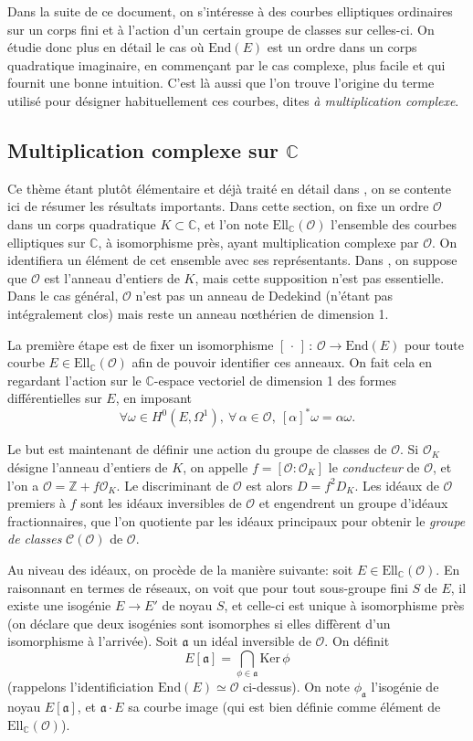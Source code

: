 \documentclass[11pt,a4paper]{article}
\newcommand{\Z}{\mathbb{Z}}
\newcommand{\C}{\mathbb{C}}
\renewcommand{\O}{\mathcal{O}}
\newcommand{\Cl}{\mathcal{C}}
\newcommand{\vers}{\longrightarrow}
\newcommand{\End}{\mathrm{End}}
\newcommand{\Ell}{\mathrm{Ell}}
\renewcommand{\frak}{\mathfrak}
\newcommand{\de}{\,:\,}
\theoremstyle{definition}
\begin{document}
Dans la suite de ce document, on s'intéresse à des courbes elliptiques ordinaires sur un corps fini et à l'action d'un certain groupe de classes sur celles-ci. On étudie donc plus en détail le cas où $\End(E)$ est un ordre dans un corps quadratique imaginaire, en commençant par le cas complexe, plus facile et qui fournit une bonne intuition. C'est là aussi que l'on trouve l'origine du terme utilisé pour désigner habituellement ces courbes, dites \emph{à multiplication complexe}.


\subsection{Multiplication complexe sur $\C$}


Ce thème étant plutôt élémentaire et déjà traité en détail dans \cite{Sil2}, on se contente ici de résumer les résultats importants. Dans cette section, on fixe un ordre $\O$ dans un corps quadratique $K\subset \C$, et l'on note $\Ell_\C(\O)$ l'ensemble des courbes elliptiques sur $\C$, à isomorphisme près, ayant multiplication complexe par $\O$. On identifiera un élément de cet ensemble avec ses représentants. Dans \cite{Sil2}, on suppose que $\O$ est l'anneau d'entiers de $K$, mais cette supposition n'est pas essentielle. Dans le cas général, $\O$ n'est pas un anneau de Dedekind (n'étant pas intégralement clos) mais reste un anneau n\oe thérien de dimension 1.

La première étape est de fixer un isomorphisme $[\,\cdot\,]\de \O\vers \End(E)$ pour toute courbe $E\in \Ell_\C(\O)$ afin de pouvoir identifier ces anneaux. On fait cela en regardant l'action sur le $\C$-espace vectoriel de dimension 1 des formes différentielles sur $E$, en imposant
$$\forall \omega\in H^0(E,\Omega^1),\ \forall\,\alpha\in\O,\ [\alpha]^*\omega = \alpha \omega.$$

Le but est maintenant de définir une action du groupe de classes de $\O$. Si $\O_K$ désigne l'anneau d'entiers de $K$, on appelle $f=[\O:\O_K]$ le \emph{conducteur} de $\O$, et l'on a $\O = \Z  + f \O_K$. Le discriminant de $\O$ est alors $D = f^2 D_K$. Les idéaux de $\O$ premiers à $f$ sont les idéaux inversibles de $\O$ et engendrent un groupe d'idéaux fractionnaires, que l'on quotiente par les idéaux principaux pour obtenir le \emph{groupe de classes} $\Cl(\O)$ de $\O$.

Au niveau des idéaux, on procède de la manière suivante: soit $E\in \Ell_\C(\O)$. En raisonnant en termes de réseaux, on voit que pour tout sous-groupe fini $S$ de $E$, il existe une isogénie $E\vers E'$ de noyau $S$, et celle-ci est unique à isomorphisme près (on déclare que deux isogénies sont isomorphes si elles diffèrent d'un isomorphisme à l'arrivée). Soit $\frak a$ un idéal inversible de $\O$. On définit
$$E[\frak a]=\bigcap_{\phi\in \frak a} \mathrm{Ker}\,\phi$$
(rappelons l'identificiation $\End(E)\simeq\O$ ci-dessus). On note $\phi_{\frak a}$ l'isogénie de noyau $E[\frak a]$, et $\frak a\cdot E$ sa courbe image (qui est bien définie comme élément de $\Ell_\C(\O)$).
\end{document}
